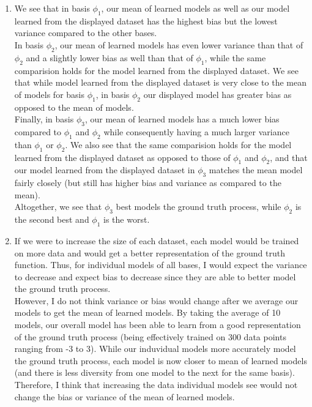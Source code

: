 \documentclass[submit]{harvardml}
\begin{document}
\begin{enumerate}
\begin{figure} [h!]
    \end{figure}
    \\ \\ \\ 
    \item We see that in basis $\phi_1$, our mean of learned models as well as our model learned from the displayed dataset has the highest bias but the lowest variance compared to the other bases. \\
    In basis $\phi_2$, our mean of learned models has even lower variance than that of $\phi_2$ and a slightly lower bias as well than that of $\phi_1$, while the same comparision holds for the model learned from the displayed dataset. We see that while model learned from the displayed dataset is very close to the mean of models for basis $\phi_1$, in basis $\phi_2$ our displayed model has greater bias as opposed to the mean of models. \\
    Finally, in basis $\phi_3$, our mean of learned models has a much lower bias compared to $\phi_1$ and $\phi_2$ while consequently having a much larger variance than $\phi_1$ or $\phi_2$. We also see that the same comparision holds for the model learned from the displayed dataset as opposed to those of $\phi_1$ and $\phi_2$, and that our model learned from the displayed dataset in $\phi_3$ matches the mean model fairly closely (but still has higher bias and variance as compared to the mean). \\
    Altogether, we see that $\phi_3$ best models the ground truth process, while $\phi_2$ is the second best and $\phi_1$ is the worst. 
    
    \item If we were to increase the size of each dataset, each model would be trained on more data and would get a better representation of the ground truth function. Thus, for individual models of all bases, I would expect the variance to decrease and expect bias to decrease since they are able to better model the ground truth process. \\
    However, I do not think variance or bias would change after we average our models to get the mean of learned models. By taking the average of 10 models, our overall model has been able to learn from a good representation of the ground truth process (being effectively trained on 300 data points ranging from -3 to 3). While our induvidual models more accurately model the ground truth process, each model is now closer to mean of learned models (and there is less diversity from one model to the next for the same basis). Therefore, I think that increasing the data individual models see would not change the bias or variance of the mean of learned models.

\end{enumerate}
\end{document}
